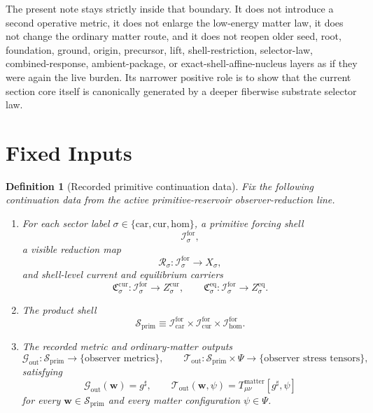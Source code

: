 \documentclass[11pt]{article}
\newcommand{\CompletedMetric}{g^{\sharp}}
\newcommand{\MatterSpace}{\Psi}
\newcommand{\Car}{\mathrm{car}}
\newcommand{\Cur}{\mathrm{cur}}
\newcommand{\Hom}{\mathrm{hom}}
\newcommand{\ForSpace}[1]{\mathcal I_{#1}^{\mathrm{for}}}
\newcommand{\PrimShell}{\mathcal S_{\mathrm{prim}}}
\newcommand{\Reduction}[1]{\mathcal R_{#1}}
\newcommand{\CurrentCarrier}[1]{\mathfrak C_{#1}^{\mathrm{cur}}}
\newcommand{\EqCarrier}[1]{\mathfrak C_{#1}^{\mathrm{eq}}}
\newcommand{\MetricOut}{\mathscr G_{\mathrm{out}}}
\newcommand{\MatterOut}{\mathscr T_{\mathrm{out}}}
\newtheorem{definition}{Definition}
\begin{document}
The present note stays strictly inside that boundary. It does not introduce a second operative metric, it does not enlarge the low-energy matter law, it does not change the ordinary matter route, and it does not reopen older seed, root, foundation, ground, origin, precursor, lift, shell-restriction, selector-law, combined-response, ambient-package, or exact-shell-affine-nucleus layers as if they were again the live burden. Its narrower positive role is to show that the current section core itself is canonically generated by a deeper fiberwise substrate selector law.

\section{Fixed Inputs}

\begin{definition}[Recorded primitive continuation data]
\label{def:fixed}
Fix the following continuation data from the active primitive-reservoir observer-reduction line.
\begin{enumerate}
    \item For each sector label \(\sigma\in\{\Car,\Cur,\Hom\}\), a primitive forcing shell
    \[
    \ForSpace{\sigma},
    \]
    a visible reduction map
    \[
    \Reduction{\sigma}:\ForSpace{\sigma}\to X_{\sigma},
    \]
    and shell-level current and equilibrium carriers
    \[
    \CurrentCarrier{\sigma}:\ForSpace{\sigma}\to Z_{\sigma}^{\mathrm{cur}},
    \qquad
    \EqCarrier{\sigma}:\ForSpace{\sigma}\to Z_{\sigma}^{\mathrm{eq}}.
    \]
    \item The product shell
    \[
    \PrimShell
    \equiv
    \ForSpace{\Car}\times \ForSpace{\Cur}\times \ForSpace{\Hom}.
    \]
    \item The recorded metric and ordinary-matter outputs
    \[
    \MetricOut:\PrimShell\to\{\text{observer metrics}\},
    \qquad
    \MatterOut:\PrimShell\times\MatterSpace\to\{\text{observer stress tensors}\},
    \]
    satisfying
    \begin{equation}
    \MetricOut(\mathbf w)=\CompletedMetric,
    \qquad
    \MatterOut(\mathbf w,\psi)
    =
    T_{\mu\nu}^{\mathrm{matter}}[\CompletedMetric,\psi]
    \label{eq:fixedoutputs}
    \end{equation}
    for every \(\mathbf w\in\PrimShell\) and every matter configuration \(\psi\in\MatterSpace\).
\end{enumerate}
\end{definition}
\end{document}
